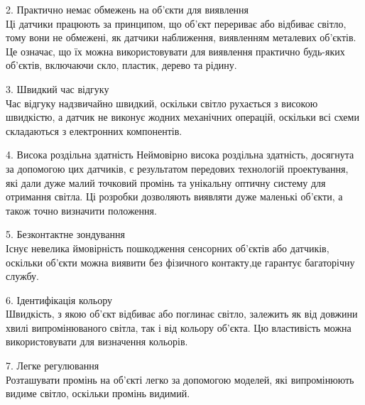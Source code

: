 \documentclass[a4paper,fontsize=12]{report}
\begin{document}
2. Практично немає обмежень на об'єкти для виявлення\\ 
Ці датчики працюють за принципом, що об’єкт перериває або відбиває світло, тому вони не обмежені, як датчики наближення, виявленням металевих об’єктів. Це означає, що їх можна використовувати для виявлення практично будь-яких об’єктів, включаючи скло, пластик, дерево та рідину.\par

3. Швидкий час відгуку\\
Час відгуку надзвичайно швидкий, оскільки світло рухається з високою швидкістю, а датчик не виконує жодних механічних операцій, оскільки всі схеми складаються з електронних компонентів.\par

4. Висока роздільна здатність
Неймовірно висока роздільна здатність, досягнута за допомогою цих датчиків, є результатом передових технологій проектування, які дали дуже малий точковий промінь та унікальну оптичну систему для отримання світла. Ці розробки дозволяють виявляти дуже маленькі об’єкти, а також точно визначити положення.\par

5. Безконтактне зондування\\
Існує невелика ймовірність пошкодження сенсорних об’єктів або датчиків, оскільки об’єкти можна виявити без фізичного контакту,це гарантує багаторічну службу.\par

6. Ідентифікація кольору\\
Швидкість, з якою об’єкт відбиває або поглинає світло, залежить як від довжини хвилі випромінюваного світла, так і від кольору об’єкта. Цю властивість можна використовувати для визначення кольорів.\par

7. Легке регулювання\\ 
Розташувати промінь на об’єкті легко за допомогою моделей, які випромінюють видиме світло, оскільки промінь видимий.

    \begin{figure}[h]
  \end{figure}
\end{document}
